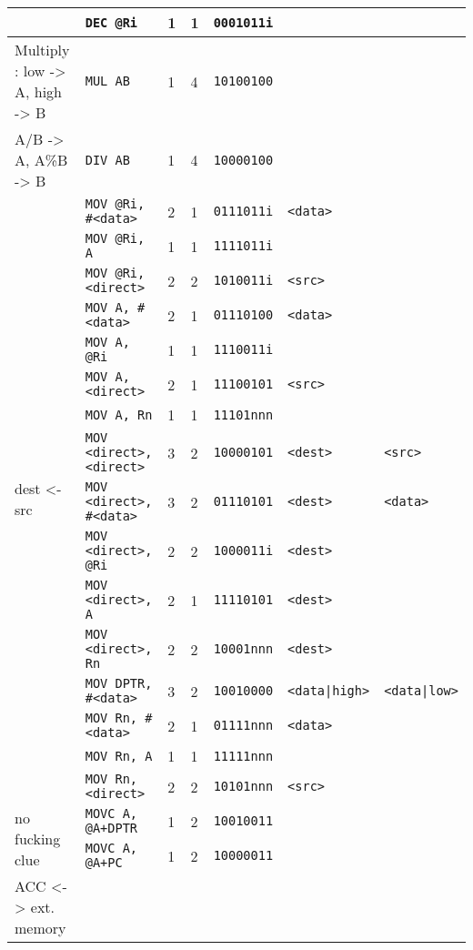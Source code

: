 \documentclass[journal]{IEEEtran}
\begin{document}
{{\begin{tabular}{|l|l|l|l|l|l|l|}
		& \texttt{DEC @Ri} & 1 & 1 & \texttt{0001011i} & & \\
		\hline
		Multiply : low -> A, high -> B
		& \texttt{MUL AB} & 1 & 4 & \texttt{10100100} & & \\
		\hline
		A/B -> A, A\%B -> B
		& \texttt{DIV AB} & 1 & 4 & \texttt{10000100} & & \\
		\hline
		\multirow{16}{*}{dest <- src}
		& \texttt{MOV @Ri, \#<data>} & 2 & 1 & \texttt{0111011i} & \texttt{<data>} & \\
		& \texttt{MOV @Ri, A} & 1 & 1 & \texttt{1111011i} & & \\
		& \texttt{MOV @Ri, <direct>} & 2 & 2 & \texttt{1010011i} & \texttt{<src>} & \\
		& \texttt{MOV A, \#<data>} & 2 & 1 & \texttt{01110100} & \texttt{<data>} & \\ %
		& \texttt{MOV A, @Ri} & 1 & 1 & \texttt{1110011i} & & \\
		& \texttt{MOV A, <direct>} & 2 & 1 & \texttt{11100101} & \texttt{<src>} & \\
		& \texttt{MOV A, Rn} & 1 & 1 & \texttt{11101nnn} & & \\
		& \texttt{MOV <direct>, <direct>} & 3 & 2 & \texttt{10000101} & \texttt{<dest>} & \texttt{<src>} \\
		& \texttt{MOV <direct>, \#<data>} & 3 & 2 & \texttt{01110101} & \texttt{<dest>} & \texttt{<data>} \\
		& \texttt{MOV <direct>, @Ri} & 2 & 2 & \texttt{1000011i} & \texttt{<dest>} & \\
		& \texttt{MOV <direct>, A} & 2 & 1 & \texttt{11110101} & \texttt{<dest>} & \\
		& \texttt{MOV <direct>, Rn} & 2 & 2 & \texttt{10001nnn} & \texttt{<dest>} & \\
		& \texttt{MOV DPTR, \#<data>} & 3 & 2 & \texttt{10010000} & \texttt{<data|high>} & \texttt{<data|low>} \\
		& \texttt{MOV Rn, \#<data>} & 2 & 1 & \texttt{01111nnn} & \texttt{<data>} & \\
		& \texttt{MOV Rn, A} & 1 & 1 & \texttt{11111nnn} & & \\
		& \texttt{MOV Rn, <direct>} & 2 & 2 & \texttt{10101nnn} & \texttt{<src>} & \\
		\hline
		\multirow{2}{*}{no fucking clue}
		& \texttt{MOVC A, @A+DPTR} & 1 & 2 & \texttt{10010011} & & \\
		& \texttt{MOVC A, @A+PC} & 1 & 2 & \texttt{10000011} & & \\
		\hline
		\multirow{3}{*}{ACC <-> ext. memory}

\end{tabular}}}
\end{document}
